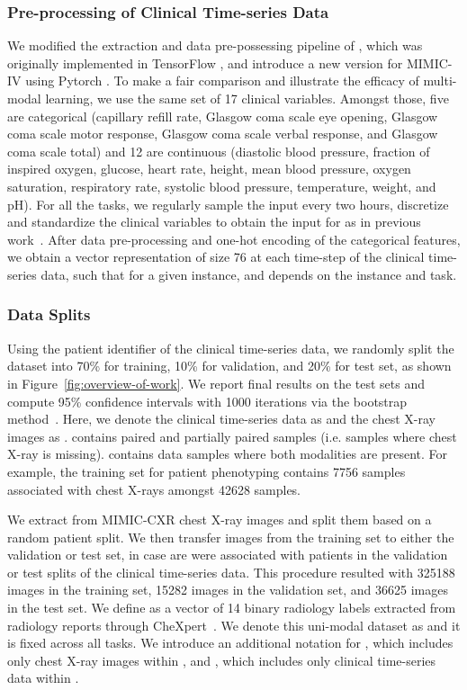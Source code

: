 \documentclass[pmlr]{jmlr}
\begin{document}
\subsubsection{Pre-processing of Clinical Time-series Data}
We modified the extraction and data pre-possessing pipeline of \cite{benchhmark}, which was originally implemented in TensorFlow \citep{tensorflow2015}, and introduce a new version for MIMIC-IV using Pytorch \citep{NEURIPS2019_9015}. To make a fair comparison and illustrate the efficacy of multi-modal learning, we use the same set of 17 clinical variables. Amongst those, five are categorical (capillary refill rate, Glasgow coma scale eye opening, Glasgow coma scale motor response, Glasgow coma scale verbal response, and Glasgow coma scale total) and 12 are continuous (diastolic blood pressure, fraction of inspired oxygen, glucose,  heart rate, height, mean blood pressure, oxygen saturation, respiratory rate, systolic blood pressure, temperature, weight, and pH). For all the tasks, we regularly sample the input every two hours, discretize and standardize the clinical variables to obtain the input for  as in previous work~\citep{benchhmark}. After data pre-processing and one-hot encoding of the categorical features, we obtain a vector representation of size 76 at each time-step of the clinical time-series data, such that for a given instance,  and  depends on the instance and task.



\subsubsection{Data Splits}
Using the patient identifier of the clinical time-series data, we randomly split the dataset into 70\% for training, 10\% for validation, and 20\% for test set, as shown in Figure~\ref{fig:overview-of-work}. We report final results on the test sets and compute 95\% confidence intervals with 1000 iterations via the bootstrap method~\citep{efron1994introduction}. Here, we denote the clinical time-series data as  and the chest X-ray images as .   contains paired and partially paired samples (i.e. samples where chest X-ray is missing).  contains data samples where both modalities are present. For example, the  training set for patient phenotyping contains 7756 samples associated with chest X-rays amongst 42628 samples.  



We extract from MIMIC-CXR chest X-ray images and split them based on a random patient split. We then transfer images from the training set to either the validation or test set, in case are were associated with patients in the validation or test splits of the clinical time-series data. This procedure resulted with 325188 images in the training set, 15282 images in the validation set, and 36625 images in the test set. We define   as a vector of 14 binary radiology labels extracted from radiology reports through CheXpert~\citep{irvin2019chexpert}. We denote this uni-modal dataset as  and it is fixed across all tasks.  We introduce an additional notation for , which includes only chest X-ray images within , and , which includes only clinical time-series data within .
\end{document}
